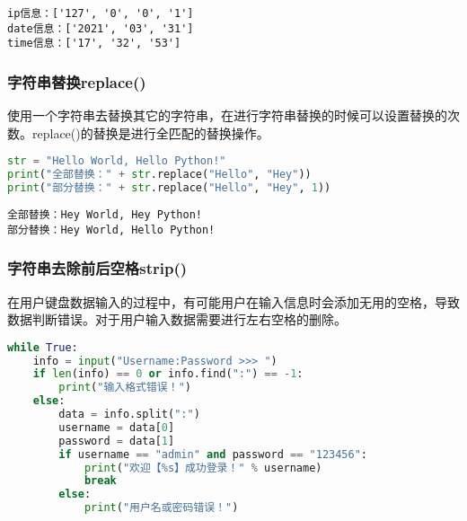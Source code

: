\begin{tcolorbox}
	\begin{verbatim}
ip信息：['127', '0', '0', '1']
date信息：['2021', '03', '31']
time信息：['17', '32', '53']
\end{verbatim}
\end{tcolorbox}

\subsubsection{字符串替换replace()}

使用一个字符串去替换其它的字符串，在进行字符串替换的时候可以设置替换的次数。replace()的替换是进行全匹配的替换操作。\\


\begin{lstlisting}[language=Python]
str = "Hello World, Hello Python!"
print("全部替换：" + str.replace("Hello", "Hey"))
print("部分替换：" + str.replace("Hello", "Hey", 1))
\end{lstlisting}

\begin{tcolorbox}
	\begin{verbatim}
全部替换：Hey World, Hey Python!
部分替换：Hey World, Hello Python!
\end{verbatim}
\end{tcolorbox}

\subsubsection{字符串去除前后空格strip()}

在用户键盘数据输入的过程中，有可能用户在输入信息时会添加无用的空格，导致数据判断错误。对于用户输入数据需要进行左右空格的删除。\\


\begin{lstlisting}[language=Python]
while True:
    info = input("Username:Password >>> ")
    if len(info) == 0 or info.find(":") == -1:
        print("输入格式错误！")
    else:
        data = info.split(":")
        username = data[0]
        password = data[1]
        if username == "admin" and password == "123456":
            print("欢迎【%s】成功登录！" % username)
            break
        else:
            print("用户名或密码错误！")
\end{lstlisting}


